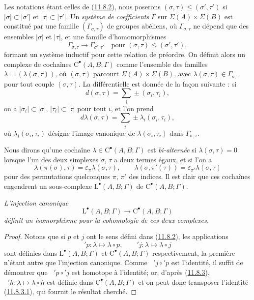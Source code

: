 \begin{env}[11.8.4]
\label{0.11.8.4-fr}
Les notations étant celles de (\hyperref[0.11.8.2-fr]{11.8.2}), nous poserons
$(\sigma,\tau)\leq(\sigma',\tau')$ si $|\sigma|\subset|\sigma'|$ et
$|\tau|\subset|\tau'|$. Un \emph{système de coefficients} $\Gamma$ sur
$\Sigma(A)\times\Sigma(B)$ est constitué par une famille
$(\Gamma_{\sigma,\tau})$ de groupes abéliens, où
$\Gamma_{\sigma,\tau}$ ne dépend que des ensembles $|\sigma|$ et $|\tau|$,
et une famille d'homomorphismes
\[
\Gamma_{\sigma,\tau}\longrightarrow\Gamma_{\sigma',\tau'}
\quad\text{pour }(\sigma,\tau)\leq(\sigma',\tau'),
\]
formant un système inductif pour cette relation de préordre. On définit alors
un complexe de cochaînes $\mathrm C^\bullet(A,B;\Gamma)$ comme l'ensemble
des familles $\lambda=(\lambda(\sigma,\tau))$, où $(\sigma,\tau)$ parcourt
$\Sigma(A)\times\Sigma(B)$, avec
$\lambda(\sigma,\tau)\in\Gamma_{\sigma,\tau}$ pour tout couple
$(\sigma,\tau)$. La différentielle est donnée de la façon suivante : si
\[
d(\sigma,\tau)=\sum_i\pm(\sigma_i,\tau_i),
\]
on a $|\sigma_i|\subset|\sigma|$, $|\tau_i|\subset|\tau|$ pour tout $i$, et
l'on prend
\[
d\lambda(\sigma,\tau)=\sum_i\pm\lambda_i(\sigma_i,\tau_i),
\]
où $\lambda_i(\sigma_i,\tau_i)$ désigne l'image canonique de
$\lambda(\sigma_i,\tau_i)$ dans $\Gamma_{\sigma,\tau}$.

Nous dirons qu'une cochaîne $\lambda\in\mathrm C^\bullet(A,B;\Gamma)$ est
\emph{bi-alternée} si $\lambda(\sigma,\tau)=0$ lorsque l'un des deux
simplexes $\sigma$, $\tau$ a deux termes égaux, et si l'on a
\[
\lambda(\pi(\sigma),\tau)=\varepsilon_\pi\lambda(\sigma,\tau),
\qquad
\lambda(\sigma,\pi'(\tau))=\varepsilon_{\pi'}\lambda(\sigma,\tau)
\]
pour des permutations quelconques $\pi$, $\pi'$ des indices. Il est clair
que ces cochaînes engendrent un sous-complexe
$\mathrm L^\bullet(A,B;\Gamma)$ de $\mathrm C^\bullet(A,B;\Gamma)$.
\end{env}

\begin{proposition}[11.8.5]
\label{0.11.8.5-fr}
\emph{L'injection canonique
\[
\mathrm L^\bullet(A,B;\Gamma)\longrightarrow
\mathrm C^\bullet(A,B;\Gamma)
\]
définit un isomorphisme pour la cohomologie de ces deux complexes.}
\end{proposition}

\begin{proof}
Notons que si $p$ et $j$ ont le sens défini dans
(\hyperref[0.11.8.2-fr]{11.8.2}), les applications
\[
{}'p:\lambda\longmapsto\lambda\circ p,\qquad
{}'j:\lambda\longmapsto\lambda\circ j
\]
sont définies dans $\mathrm L^\bullet(A,B;\Gamma)$ et
$\mathrm C^\bullet(A,B;\Gamma)$ respectivement, la première n'étant autre
que l'injection canonique. Comme $\mathop{}'j\circ{}'p$ est l'identité, il
suffit de démontrer que $\mathop{}'p\circ{}'j$ est homotope à l'identité; or,
d'après (\hyperref[0.11.8.3-fr]{11.8.3}),
$\mathop{}'h:\lambda\mapsto\lambda\circ h$ est définie dans
$\mathrm C^\bullet(A,B;\Gamma)$ et on peut donc transposer l'identité
(\hyperref[0.11.8.3.1-fr]{11.8.3.1}), qui fournit le résultat cherché.
\end{proof}

